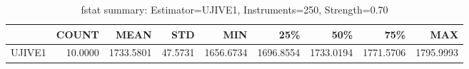 \begin{table}[ht]
\centering
\caption{fstat summary: Estimator=UJIVE1, Instruments=250, Strength=0.70}
\begin{tabular}{lrrrrrrrr}
\toprule
 & COUNT & MEAN & STD & MIN & 25\% & 50\% & 75\% & MAX \\
\midrule
UJIVE1 & 10.0000 & 1733.5801 & 47.5731 & 1656.6734 & 1696.8554 & 1733.0194 & 1771.5706 & 1795.9993 \\
\bottomrule
\end{tabular}
\end{table}
